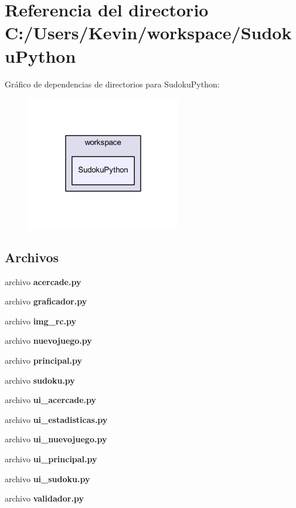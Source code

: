 \section{Referencia del directorio C\-:/\-Users/\-Kevin/workspace/\-Sudoku\-Python}
\label{dir_ecd59f5231c63ce72ee8f4c4678b1082}
Gráfico de dependencias de directorios para Sudoku\-Python\-:\nopagebreak
\begin{figure}[H]
\begin{center}
\leavevmode
\includegraphics[width=192pt]{dir_ecd59f5231c63ce72ee8f4c4678b1082_dep}
\end{center}
\end{figure}
\subsection*{Archivos}
\begin{DoxyCompactItemize}
\item 
archivo {\bfseries acercade.\-py}
\item 
archivo {\bfseries graficador.\-py}
\item 
archivo {\bfseries img\-\_\-rc.\-py}
\item 
archivo {\bfseries nuevojuego.\-py}
\item 
archivo {\bfseries principal.\-py}
\item 
archivo {\bfseries sudoku.\-py}
\item 
archivo {\bfseries ui\-\_\-acercade.\-py}
\item 
archivo {\bfseries ui\-\_\-estadisticas.\-py}
\item 
archivo {\bfseries ui\-\_\-nuevojuego.\-py}
\item 
archivo {\bfseries ui\-\_\-principal.\-py}
\item 
archivo {\bfseries ui\-\_\-sudoku.\-py}
\item 
archivo {\bfseries validador.\-py}
\end{DoxyCompactItemize}
